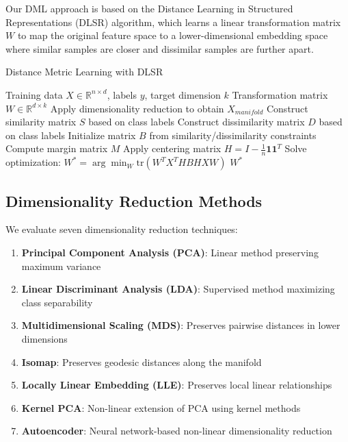 \documentclass[12pt,a4paper]{article}
\begin{document}
Our DML approach is based on the Distance Learning in Structured Representations (DLSR) algorithm, which learns a linear transformation matrix $W$ to map the original feature space to a lower-dimensional embedding space where similar samples are closer and dissimilar samples are further apart.

\begin{algorithm}
\caption{Distance Metric Learning with DLSR}
\begin{algorithmic}[1]
\REQUIRE Training data $X \in \mathbb{R}^{n \times d}$, labels $y$, target dimension $k$
\ENSURE Transformation matrix $W \in \mathbb{R}^{d \times k}$
\STATE Apply dimensionality reduction to obtain $X_{manifold}$
\STATE Construct similarity matrix $S$ based on class labels
\STATE Construct dissimilarity matrix $D$ based on class labels  
\STATE Initialize matrix $B$ from similarity/dissimilarity constraints
\STATE Compute margin matrix $M$
\STATE Apply centering matrix $H = I - \frac{1}{n}\mathbf{1}\mathbf{1}^T$
\STATE Solve optimization: $W^* = \arg\min_W \text{tr}(W^T X^T H B H X W)$
\RETURN $W^*$
\end{algorithmic}
\end{algorithm}

\subsection{Dimensionality Reduction Methods}

We evaluate seven dimensionality reduction techniques:

\begin{enumerate}
    \item \textbf{Principal Component Analysis (PCA)}: Linear method preserving maximum variance
    \item \textbf{Linear Discriminant Analysis (LDA)}: Supervised method maximizing class separability
    \item \textbf{Multidimensional Scaling (MDS)}: Preserves pairwise distances in lower dimensions
    \item \textbf{Isomap}: Preserves geodesic distances along the manifold
    \item \textbf{Locally Linear Embedding (LLE)}: Preserves local linear relationships
    \item \textbf{Kernel PCA}: Non-linear extension of PCA using kernel methods
    \item \textbf{Autoencoder}: Neural network-based non-linear dimensionality reduction
\end{enumerate}
\end{document}
